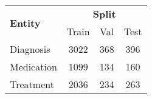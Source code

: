 
\begin{tabular}{l ccc}
    \toprule
    \multirow{2}{*}[-0.5\dimexpr \aboverulesep + \belowrulesep + \cmidrulewidth]{\bfseries Entity} &
    \multicolumn{3}{c}{\bfseries Split} \\
    \cmidrule(lr){2-4}
    & Train & Val & Test \\
    \midrule
    Diagnosis & 3022 & 368 & 396 \\
    Medication & 1099 & 134 & 160 \\
    Treatment & 2036 & 234 & 263 \\
    \bottomrule
\end{tabular}
